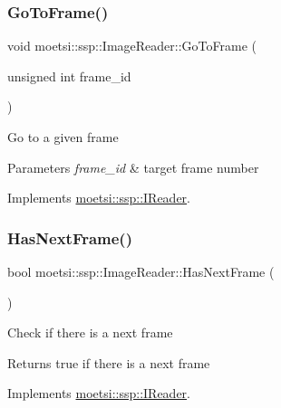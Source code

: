 \subsubsection{\texorpdfstring{Go\+To\+Frame()}{GoToFrame()}}
{\footnotesize\ttfamily void moetsi\+::ssp\+::\+Image\+Reader\+::\+Go\+To\+Frame (\begin{DoxyParamCaption}\item[{unsigned int}]{frame\+\_\+id }\end{DoxyParamCaption})\hspace{0.3cm}{\ttfamily [virtual]}}

Go to a given frame 
\begin{DoxyParams}{Parameters}
{\em frame\+\_\+id} & target frame number \\
\hline
\end{DoxyParams}


Implements \hyperlink{classmoetsi_1_1ssp_1_1IReader_a6f1be3c06538992cca6d550bd9566681}{moetsi\+::ssp\+::\+I\+Reader}.

\mbox{\label{classmoetsi_1_1ssp_1_1ImageReader_ad8e87720ca0ec97de501f1070119b28d}} 
\subsubsection{\texorpdfstring{Has\+Next\+Frame()}{HasNextFrame()}}
{\footnotesize\ttfamily bool moetsi\+::ssp\+::\+Image\+Reader\+::\+Has\+Next\+Frame (\begin{DoxyParamCaption}{ }\end{DoxyParamCaption})\hspace{0.3cm}{\ttfamily [virtual]}}

Check if there is a next frame \begin{DoxyReturn}{Returns}
true if there is a next frame 
\end{DoxyReturn}


Implements \hyperlink{classmoetsi_1_1ssp_1_1IReader_af9186ba41e136dc4ec3242b5dd55fa04}{moetsi\+::ssp\+::\+I\+Reader}.

\mbox{\label{classmoetsi_1_1ssp_1_1ImageReader_a9b0a43f9a4fff4d0b8448e8ba168ad05}} 
